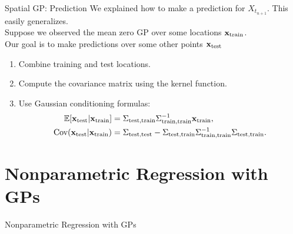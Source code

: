 \documentclass[11pt,handout,aspectratio=169]{beamer}
\begin{document}
\begin{frame}{Spatial GP: Prediction}
We explained how to make a prediction for $X_{t_{n+1}}$. This easily generalizes.\\[3mm]


Suppose we observed the mean zero GP over some locations $\mathbf{x}_{\rm train}$.\\[3mm] 

Our goal is to make predictions over some other points $\mathbf{x}_{\rm test}$
\begin{enumerate}
    \item Combine training and test locations.
    \item Compute the covariance matrix using the kernel function.
    \item Use Gaussian conditioning formulas:
    \begin{align*}
        \mathbb{E}[\mathbf{x}_\text{test} | \mathbf{x}_\text{train}] &= \Sigma_\text{test,train} \Sigma_\text{train,train}^{-1} \mathbf{x}_\text{train}, \\
        \text{Cov}(\mathbf{x}_\text{test} | \mathbf{x}_\text{train}) &= \Sigma_\text{test,test} - \Sigma_\text{test,train} \Sigma_\text{train,train}^{-1} \Sigma_\text{test,train}.
    \end{align*}
\end{enumerate}
\end{frame}




\section{Nonparametric Regression with GPs}


\begin{frame}{}
	\begin{center}
		{\Huge \alert{Nonparametric Regression with GPs}}
	\end{center}
\end{frame}
\end{document}
